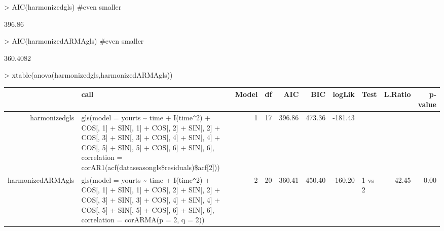 \documentclass[11pt, a4paper]{article} %
\begin{document}
\begin{Schunk}
\begin{Sinput}
> AIC(harmonizedgls) #even smaller 
\end{Sinput}
\begin{Soutput}
[1] 396.86
\end{Soutput}
\begin{Sinput}
> AIC(harmonizedARMAgls) #even smaller 
\end{Sinput}
\begin{Soutput}
[1] 360.4082
\end{Soutput}
\begin{Sinput}
> xtable(anova(harmonizedgls,harmonizedARMAgls))
\end{Sinput}
\begin{Soutput}
\begin{table}[ht]
\centering
\begin{tabular}{rlrrrrrlrr}
  \hline
 & call & Model & df & AIC & BIC & logLik & Test & L.Ratio & p-value \\ 
  \hline
harmonizedgls & gls(model = yourts \~{} time + I(time\verb|^|2) + COS[, 1] + SIN[, 1] +     COS[, 2] + SIN[, 2] + COS[, 3] + SIN[, 3] + COS[, 4] + SIN[,     4] + COS[, 5] + SIN[, 5] + COS[, 6] + SIN[, 6], correlation = corAR1(acf(dataseasongls\$residuals)\$acf[2])) &   1 &  17 & 396.86 & 473.36 & -181.43 &  &  &  \\ 
  harmonizedARMAgls & gls(model = yourts \~{} time + I(time\verb|^|2) + COS[, 1] + SIN[, 1] +     COS[, 2] + SIN[, 2] + COS[, 3] + SIN[, 3] + COS[, 4] + SIN[,     4] + COS[, 5] + SIN[, 5] + COS[, 6] + SIN[, 6], correlation = corARMA(p = 2,     q = 2)) &   2 &  20 & 360.41 & 450.40 & -160.20 & 1 vs 2 & 42.45 & 0.00 \\ 
   \hline
\end{tabular}
\end{table}
\end{Soutput}
\end{Schunk}
\end{document}
